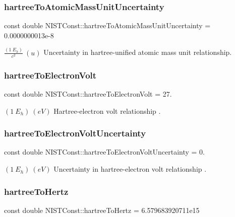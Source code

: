 \subsubsection{\texorpdfstring{hartree\+To\+Atomic\+Mass\+Unit\+Uncertainty}{hartreeToAtomicMassUnitUncertainty}}
{\footnotesize\ttfamily const double N\+I\+S\+T\+Const\+::hartree\+To\+Atomic\+Mass\+Unit\+Uncertainty = 0.\+0000000013e-\/8}

$\frac{(1\ E_h)}{c^2} \ (u)$ Uncertainty in hartree-\/unified atomic mass unit relationship. \mbox{\label{group___n_i_s_t_const-_hartree_ga225406ee0c3f44db3c49563e7dd253ce}} 
\subsubsection{\texorpdfstring{hartree\+To\+Electron\+Volt}{hartreeToElectronVolt}}
{\footnotesize\ttfamily const double N\+I\+S\+T\+Const\+::hartree\+To\+Electron\+Volt = 27.}

$(1\ E_h) \ (eV)$ Hartree-\/electron volt relationship . \mbox{\label{group___n_i_s_t_const-_hartree_ga8335ddd7939b91f3191fdbed28767947}} 
\subsubsection{\texorpdfstring{hartree\+To\+Electron\+Volt\+Uncertainty}{hartreeToElectronVoltUncertainty}}
{\footnotesize\ttfamily const double N\+I\+S\+T\+Const\+::hartree\+To\+Electron\+Volt\+Uncertainty = 0.}

$(1\ E_h) \ (eV)$ Uncertainty in hartree-\/electron volt relationship . \mbox{\label{group___n_i_s_t_const-_hartree_gaf2341e65d7aba07555272afe4a14345e}} 
\subsubsection{\texorpdfstring{hartree\+To\+Hertz}{hartreeToHertz}}
{\footnotesize\ttfamily const double N\+I\+S\+T\+Const\+::hartree\+To\+Hertz = 6.\+579683920711e15}

